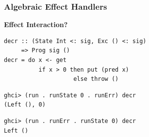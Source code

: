 \documentclass[xcolor=pdftex,dvipsnames,table]{beamer}
\begin{document}
{
\begin{frame}[fragile, t]
  \frametitle{Algebraic Effect Handlers}
  \begin{center}
    \textbf{\Large{Effect Interaction?}}
  \end{center}
  \begin{verbatim}
decr :: (State Int <: sig, Exc () <: sig)
     => Prog sig ()
decr = do x <- get
          if x > 0 then put (pred x)
                    else throw ()
  \end{verbatim}
  \pause
  \begin{verbatim}
ghci> (run . runState 0 . runErr) decr
(Left (), 0)
  \end{verbatim}
  \pause
  \begin{verbatim}
ghci> (run . runErr . runState 0) decr
Left ()
  \end{verbatim}

  {
  \TPMargin{2mm}
  }
\end{frame}
}
\end{document}
